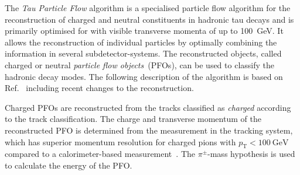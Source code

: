
The \emph{Tau Particle Flow} algorithm is a specialised particle flow algorithm
for the reconstruction of charged and neutral constituents in hadronic tau
decays and is primarily optimised for \tauhadvis with visible transverse momenta
of up to \SI{100}{\giga\electronvolt}. It allows the reconstruction of
individual particles by optimally combining the information in several
subdetector-systems. The reconstructed objects, called charged or neutral
\emph{particle flow objects}~(PFOs), can be used to classify the hadronic decay
modes. The following description of the algorithm is based on
Ref.~\cite{atlas:taurec:decaymodes} including recent changes to the
reconstruction.

Charged PFOs are reconstructed from the tracks classified as \emph{charged}
according to the track classification. The charge and transverse momentum of the
reconstructed PFO is determined from the measurement in the tracking system,
which has superior momentum resolution for charged pions with
$p_\text{T} < \SI{100}{\giga\electronvolt}$ compared to a calorimeter-based
measurement~\cite{atlas:taurec:decaymodes}. The $\pi^\pm$-mass hypothesis is
used to calculate the energy of the PFO.

